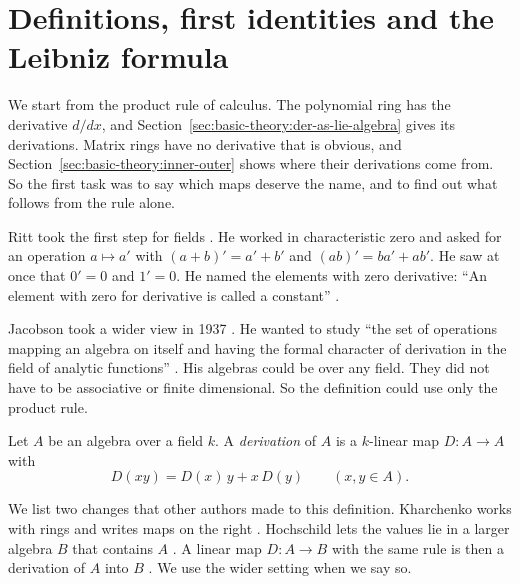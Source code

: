 \section{Definitions, first identities and the Leibniz formula}\label{sec:basic-theory:definitions}

We start from the product rule of calculus. The polynomial ring has the
derivative $d/dx$, and Section~\ref{sec:basic-theory:der-as-lie-algebra} gives its
derivations.
Matrix rings have no derivative that is obvious, and
Section~\ref{sec:basic-theory:inner-outer} shows where their derivations come
from. So the first task was to say which maps deserve the name, and to find out
what follows from the rule alone.

Ritt took the first step for fields \cite[p.~1]{Ritt1950}. He worked in
characteristic zero and asked for an operation $a \mapsto a'$ with
$(a+b)' = a'+b'$ and $(ab)' = ba' + ab'$. He saw at once that $0' = 0$ and
$1' = 0$. He named the elements with zero derivative: ``An element with zero
for derivative is called a constant'' \cite[p.~1]{Ritt1950}.

Jacobson took a wider view in 1937 \cite[p.~206]{Jacobson1937}. He wanted to study ``the set of operations
mapping an algebra on itself and having the formal character of derivation in
the field of analytic functions'' \cite[p.~206]{Jacobson1937}. His algebras
could be over any field. They did not have to be associative or finite
dimensional. So the definition could use only the product rule.

\begin{definition}\label{def:basic:derivation}
Let $A$ be an algebra over a field $k$. A \emph{derivation} of $A$ is a
$k$-linear map $D\colon A \to A$ with
\[
D(xy) = D(x)\,y + x\,D(y) \qquad (x, y \in A).
\]
\end{definition}

We list two changes that other authors made to this definition. Kharchenko
works with rings and writes maps on the right \cite[p.~7]{Kharchenko1991}.
Hochschild lets the values lie in a larger algebra $B$ that contains $A$ \cite[p.~688]{Hochschild1942}. A linear map
$D\colon A \to B$ with the same rule is then a derivation of $A$ into $B$
\cite[Definition~3.1, p.~688]{Hochschild1942}. We use the wider setting when
we say so.

